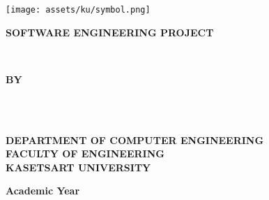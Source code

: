 \thispagestyle{empty}
\begin{center}

    \texttt{[image: assets/ku/symbol.png]}\vspace{.7in}

    {\huge\textbf{SOFTWARE ENGINEERING PROJECT}}\vspace{1in}

    {\huge\textbf{\usevar{\srsTitle}\\
    \usevar{\srsSubtitle}}}\vspace{1in}


    {\huge\textbf{BY}}\vspace{.5in}

    {\huge\textbf{%
            \usevar{\srsAuthorOne} \\
            \usevar{\srsAuthorTwo} \\
        }}\vfill

    {\Large\textbf{%
        DEPARTMENT OF COMPUTER ENGINEERING\\
        FACULTY OF ENGINEERING\\
        KASETSART UNIVERSITY\\
    }}\vspace{.5in}

    {\LARGE\textbf{Academic Year \usevar{\srsAcademicYear}}}

\end{center}
\restoregeometry